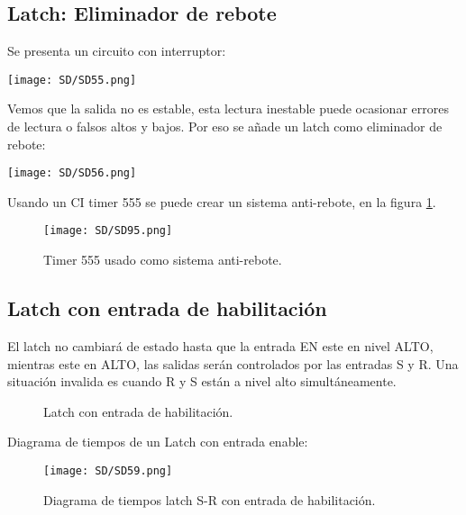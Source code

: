 \documentclass[
	12pt, %
	fleqn, %
	a4paper, %
]{LegrandOrangeBook}
\begin{document}
\subsection{Latch: Eliminador de rebote}
Se presenta un circuito con interruptor:\\
\begin{center}
\texttt{[image: SD/SD55.png]}
\end{center}
Vemos que la salida no es estable, esta lectura inestable puede ocasionar errores de lectura o falsos altos y bajos. Por eso se añade un latch como eliminador de rebote:\\
\begin{center}
\texttt{[image: SD/SD56.png]}
\end{center}
Usando un CI timer 555 se puede crear un sistema anti-rebote, en la figura \ref{fig:timer 555}.
\begin{figure}[H]
\centering
\texttt{[image: SD/SD95.png]}
\caption{Timer 555 usado como sistema anti-rebote.}
\label{fig:timer 555}
\end{figure}
\subsection{Latch con entrada de habilitación}
El latch no cambiará de estado hasta que la entrada EN este en nivel ALTO, mientras este en ALTO, las salidas serán controlados por las entradas S y R. Una situación invalida es cuando R y S están a nivel alto simultáneamente.
\begin{figure}[h]
    \centering
    \qquad
    \caption{Latch con entrada de habilitación.}
\end{figure}
Diagrama de tiempos de un Latch con entrada enable:
\begin{figure}[H]
\centering
\texttt{[image: SD/SD59.png]}
\caption{Diagrama de tiempos latch S-R con entrada de habilitación.}
\end{figure}
\end{document}
